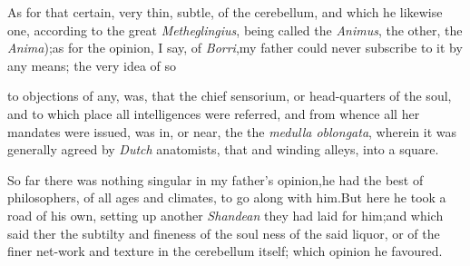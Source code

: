 \documentclass{article}
\begin{document}
As for that certain, very thin, subtle, 
of the cerebellum, and which he likewise
one, according to the great \textit{Metheglingius},
being called the \textit{Animus}, the other, the
\textit{Anima});\tsk as for the opinion, I say, of
\textit{Borri},\tsk my father could never subscribe to it by any
means; the very idea of so 

\noindent
{}
to objections of any, was, that the chief sensorium, or
head-quarters of the soul, and to which place all intelligences
were referred, and from whence all her mandates were issued,\tsk
was in, or near, the\break
{}
the \textit{medulla oblongata}, wherein it was ge\-nerally agreed
by \textit{Dutch} anatomists, that
 and
winding alleys, into a square.

So far there was nothing singular in my father’s
opinion,\tsk he had the best of philosophers, of all ages and
climates, to go along with him.\tsk But here he took a\break
road of his own, setting up another \textit{Shan\-dean}  they had laid for him;\tsk and which
said 
ther the subtilty and
fineness of the soul  ness of
the said liquor, or of the finer net-work and texture in the
cerebellum itself; which opinion he favoured.
\end{document}
